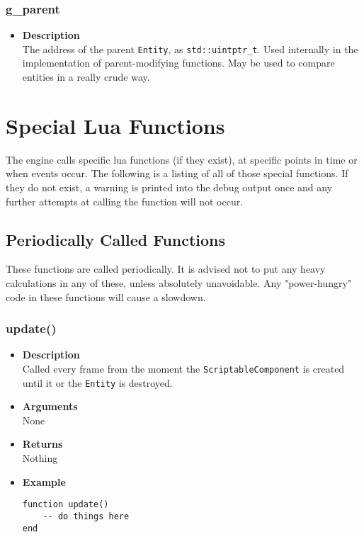\documentclass[12pt,a4paper]{article}
\begin{document}
\subsubsection{g\_parent}
\begin{itemize}
	\item[]{\bf Description}
		\\ The address of the parent \texttt{Entity}, as \texttt{std::uintptr\_t}. Used internally in the implementation of parent-modifying functions. May be used to compare entities in a really crude way.
\end{itemize}

\pagebreak
\section{Special Lua Functions}

The engine calls specific lua functions (if they exist), at specific points in time or when events occur. The following is a listing of all of those special functions.
If they do not exist, a warning is printed into the debug output once and any further attempts at calling the function will not occur.

\subsection{Periodically Called Functions}

These functions are called periodically. It is advised not to put any heavy calculations in any of these, unless absolutely unavoidable. Any "power-hungry" code in these functions will cause a slowdown.

\subsubsection{update()}
\begin{itemize}
	\item[]{\bf Description}
		\\ Called every frame from the moment the \texttt{ScriptableComponent} is created until it or the \texttt{Entity} is destroyed.
	\item[]{\bf Arguments}
		\\ None
	\item[]{\bf Returns}
		\\ Nothing
	\item[]{\bf Example}
\begin{lstlisting}[language={[5.0]Lua}]
function update()
	-- do things here
end
\end{lstlisting}
\end{itemize}
\end{document}
